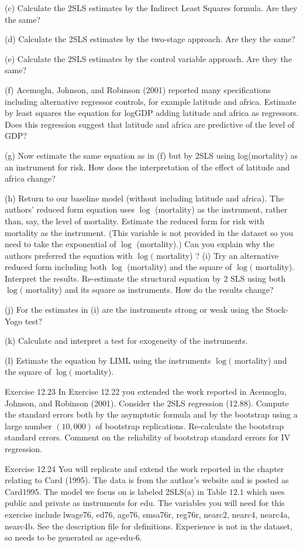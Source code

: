 \documentclass[10pt]{article}
\begin{document}
(c) Calculate the 2SLS estimates by the Indirect Least Squares formula. Are they the same?

(d) Calculate the 2SLS estimates by the two-stage approach. Are they the same?

(e) Calculate the 2SLS estimates by the control variable approach. Are they the same?

(f) Acemoglu, Johnson, and Robinson (2001) reported many specifications including alternative regressor controls, for example latitude and africa. Estimate by least squares the equation for logGDP adding latitude and africa as regressors. Does this regression suggest that latitude and africa are predictive of the level of GDP?

(g) Now estimate the same equation as in (f) but by 2SLS using log(mortality) as an instrument for risk. How does the interpretation of the effect of latitude and africa change?

(h) Return to our baseline model (without including latitude and africa). The authors' reduced form equation uses $\log$ (mortality) as the instrument, rather than, say, the level of mortality. Estimate the reduced form for risk with mortality as the instrument. (This variable is not provided in the dataset so you need to take the exponential of $\log$ (mortality).) Can you explain why the authors preferred the equation with $\log ($ mortality) ? (i) Try an alternative reduced form including both $\log$ (mortality) and the square of $\log ($ mortality). Interpret the results. Re-estimate the structural equation by 2 SLS using both $\log ($ mortality) and its square as instruments. How do the results change?

(j) For the estimates in (i) are the instruments strong or weak using the Stock-Yogo test?

(k) Calculate and interpret a test for exogeneity of the instruments.

(l) Estimate the equation by LIML using the instruments $\log ($ mortality) and the square of $\log ($ mortality).

Exercise 12.23 In Exercise 12.22 you extended the work reported in Acemoglu, Johnson, and Robinson (2001). Consider the 2SLS regression (12.88). Compute the standard errors both by the asymptotic formula and by the bootstrap using a large number $(10,000)$ of bootstrap replications. Re-calculate the bootstrap standard errors. Comment on the reliability of bootstrap standard errors for IV regression.

Exercise 12.24 You will replicate and extend the work reported in the chapter relating to Card (1995). The data is from the author's website and is posted as Card1995. The model we focus on is labeled 2SLS(a) in Table $12.1$ which uses public and private as instruments for edu. The variables you will need for this exercise include lwage76, ed76, age76, smsa76r, reg76r, nearc2, nearc4, nearc4a, nearc4b. See the description file for definitions. Experience is not in the dataset, so needs to be generated as age-edu-6.
\end{document}
